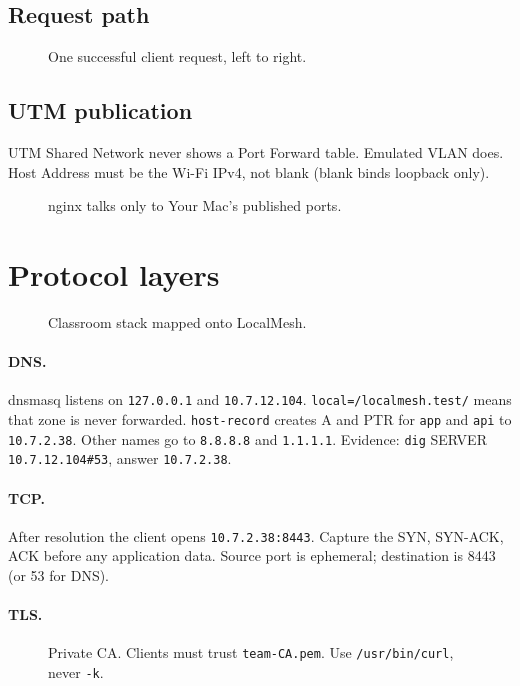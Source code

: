\documentclass[11pt,a4paper]{article}
\begin{document}
\subsection{Request path}
\begin{figure}[H]
\centering
\resizebox{\textwidth}{!}{\drawRequestPath}
\caption{One successful client request, left to right.}
\end{figure}

\subsection{UTM publication}
UTM Shared Network never shows a Port Forward table. Emulated VLAN does.
Host Address must be the Wi-Fi IPv4, not blank (blank binds loopback only).

\begin{figure}[H]
\centering
\resizebox{0.92\textwidth}{!}{\drawUtm}
\caption{nginx talks only to Your Mac's published ports.}
\end{figure}

\section{Protocol layers}

\begin{figure}[H]
\centering
\drawOsi
\caption{Classroom stack mapped onto LocalMesh.}
\end{figure}

\paragraph{DNS.}
dnsmasq listens on \texttt{127.0.0.1} and \texttt{10.7.12.104}.
\texttt{local=/localmesh.test/} means that zone is never forwarded.
\texttt{host-record} creates A and PTR for \texttt{app} and \texttt{api} to \texttt{10.7.2.38}.
Other names go to \texttt{8.8.8.8} and \texttt{1.1.1.1}. Evidence: \texttt{dig} SERVER
\texttt{10.7.12.104\#53}, answer \texttt{10.7.2.38}.

\paragraph{TCP.}
After resolution the client opens \texttt{10.7.2.38:8443}. Capture the SYN, SYN-ACK, ACK
before any application data. Source port is ephemeral; destination is 8443 (or 53 for DNS).

\paragraph{TLS.}
\begin{figure}[H]
\centering
\drawTls
\caption{Private CA. Clients must trust \texttt{team-CA.pem}. Use \texttt{/usr/bin/curl}, never \texttt{-k}.}
\end{figure}
\end{document}
